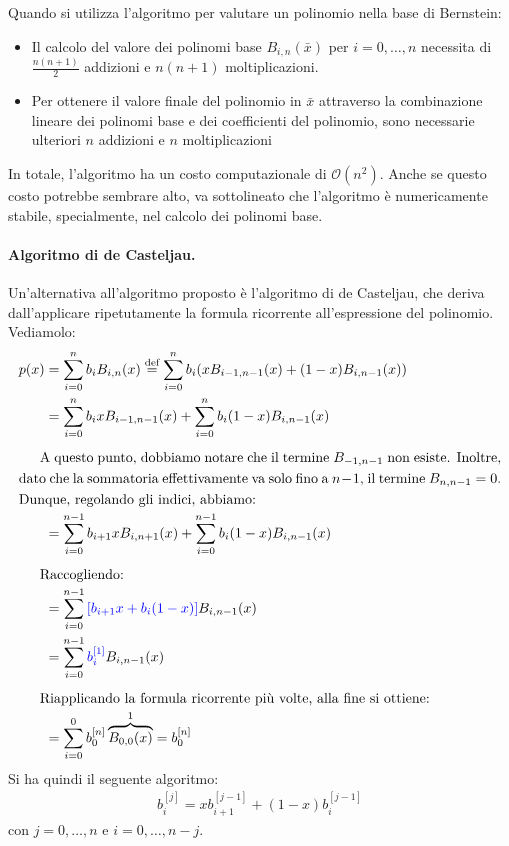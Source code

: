 \documentclass{article}
\numberwithin{equation}{section}
\newcommand{\alignedintertext}[1]{%
  \noalign{%
    \vskip\belowdisplayshortskip
    \vtop{\hsize=\linewidth#1\par
    \expandafter}%
    \expandafter\prevdepth\the\prevdepth
  }%
}
\begin{document}
Quando si utilizza l'algoritmo per valutare un polinomio nella base di
Bernstein:
\begin{itemize}
    \item Il calcolo del valore dei polinomi base $B_{i,n}(\bar{x})$ per
        $i=0,\ldots,n$ necessita di $\frac{n(n+1)}{2}$ addizioni e
        $n(n+1)$ moltiplicazioni.
    \item Per ottenere il valore finale del polinomio in $\bar{x}$ attraverso
        la combinazione lineare dei polinomi base e dei coefficienti del
        polinomio, sono necessarie ulteriori $n$ addizioni e $n$
        moltiplicazioni
\end{itemize}
In totale, l'algoritmo ha un costo computazionale di $\mathcal{O}(n^2)$. 
Anche se questo costo potrebbe sembrare alto, va sottolineato che l'algoritmo
è numericamente stabile, specialmente, nel calcolo dei polinomi base.
\paragraph{Algoritmo di de Casteljau.} Un'alternativa all'algoritmo proposto è
l'algoritmo di de Casteljau, che deriva dall'applicare ripetutamente la
formula ricorrente all'espressione del polinomio. Vediamolo: 
\begin{equation*}
  \begin{aligned}
      p(x)&=\displaystyle\sum_{i=0}^{n}b_iB_{i,n}(x)\overset{\text{def}}{=}\displaystyle\sum_{i=0}^{n}b_i(xB_{i-1,n-1}(x)+(1-x)B_{i,n-1}(x))\\
          &=\displaystyle\sum_{i=0}^{n}b_ixB_{i-1,n-1}(x)+\displaystyle\sum_{i=0}^{n}b_i(1-x)B_{i,n-1}(x)
          \\ 
          \alignedintertext{A questo punto, dobbiamo notare che il termine $B_{-1,n-1}$ non
          esiste. Inoltre, dato che la sommatoria effettivamente va solo fino
      a $n-1$, il termine $B_{n,n-1}=0$. Dunque, regolando gli indici,
  abbiamo:}
          &=\displaystyle\sum_{i=0}^{n-1}b_{i+1}xB_{i,n+1}(x)+\displaystyle\sum_{i=0}^{n-1}b_i(1-x)B_{i,n-1}(x)\\
          \alignedintertext{Raccogliendo:}
          &=
          \displaystyle\sum_{i=0}^{n-1}{\color{blue}\left[b_{i+1}x+b_i(1-x)\right]}B_{i,n-1}(x)\\ 
          &=\displaystyle\sum_{i=0}^{n-1}{\color{blue}b_i^{[1]}}B_{i,n-1}(x) \\
          \alignedintertext{Riapplicando la formula ricorrente più volte, alla
          fine si ottiene:}
          &=\displaystyle\sum_{i=0}^{0}b_0^{[n]}\overbrace{B_{0,0}(x)}^1=b_0^{[n]}
  \end{aligned}  
\end{equation*}
Si ha quindi il seguente algoritmo:
\begin{equation} \label{eq:de_casteljau}
   \begin{aligned}
       b_{i}^{[j]}=xb_{i+1}^{[j-1]}+(1-x)b_{i}^{[j-1]}
   \end{aligned} 
\end{equation}
con $j=0,\ldots,n$ e $i=0,\ldots,n-j$.
\end{document}
